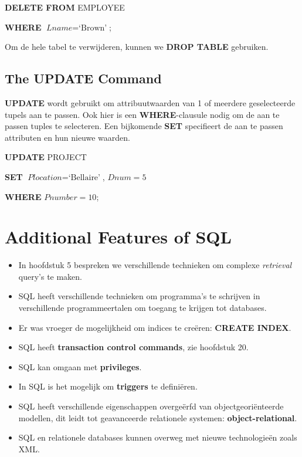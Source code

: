 \vspace{1mm}\hspace{10mm}
\textbf{DELETE FROM} EMPLOYEE

\hspace{10mm}
\textbf{WHERE} $\textit{Lname} = \text{`Brown'}$;
\vspace{3mm}

\noindent Om de hele tabel te verwijderen, kunnen we \textbf{DROP TABLE} gebruiken.


\subsection{The UPDATE Command}
\textbf{UPDATE} wordt gebruikt om attribuutwaarden van 1 of meerdere geselecteerde tupels aan te passen. Ook hier is een \textbf{WHERE}-clausule nodig om de aan te passen tuples te selecteren. Een bijkomende \textbf{SET} specifieert de aan te passen attributen en hun nieuwe waarden.

\vspace{1mm}\hspace{10mm}
\textbf{UPDATE} PROJECT

\hspace{10mm}
\textbf{SET} $\textit{Plocation} = \text{`Bellaire'}$, $\textit{Dnum} = 5$

\hspace{10mm}
\textbf{WHERE} $\textit{Pnumber} = 10$;


\section{Additional Features of SQL}
\begin{itemize}
\item In hoofdstuk 5 bespreken we verschillende technieken om complexe \textit{retrieval} query's te maken.
\item SQL heeft verschillende technieken om programma's te schrijven in verschillende programmeertalen om toegang te krijgen tot databases.
\item Er was vroeger de mogelijkheid om indices te cre\"eren: \textbf{CREATE INDEX}.
\item SQL heeft \textbf{transaction control commands}, zie hoofdstuk 20.
\item SQL kan omgaan met \textbf{privileges}.
\item In SQL is het mogelijk om \textbf{triggers} te defini\"eren.
\item SQL heeft verschillende eigenschappen overge\"erfd van objectgeori\"enteerde modellen, dit leidt tot geavanceerde relationele systemen: \textbf{object-relational}.
\item SQL en relationele databases kunnen overweg met nieuwe technologie\"en zoals XML.
\end{itemize}
